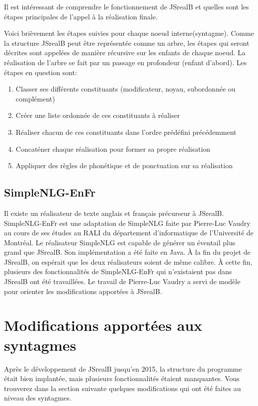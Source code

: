 \documentclass[11pt]{article} %
\newcommand{\system}[1]{\textsf{#1}}
\newcommand{\JSB}{\system{JSrealB}}
\begin{document}
Il est intéressant de comprendre le fonctionnement de \JSB{} et quelles
sont les étapes principales de l'appel à la réalisation finale.

Voici brièvement les étapes suivies pour chaque noeud interne(syntagme).
Comme la structure \JSB{} peut être représentée comme un arbre, les
étapes qui seront décrites sont appelées de manière récursive sur les
enfants de chaque noeud. La réalisation de l'arbre se fait par un
passage en profondeur (enfant d'abord). Les étapes en question sont:
\begin{enumerate}
\item Classer ses différents constituants (modificateur, noyau, subordonnée
ou complément)
\item Créer une liste ordonnée de ces constituants à réaliser
\item Réaliser chacun de ces constituants dans l'ordre prédéfini précédemment
\item Concaténer chaque réalisation pour former sa propre réalisation
\item Appliquer des règles de phonétique et de ponctuation sur sa réalisation
\end{enumerate}

\subsection{\system{SimpleNLG-EnFr}}

Il existe un réalisateur de texte anglais et français précurseur à
\JSB{}. SimpleNLG-EnFr est une adaptation de \system{SimpleNLG} faite par Pierre-Luc
Vaudry au cours de ses études au RALI du département d'informatique
de l'Université de Montréal\cite{simpleNLGVaudry}. Le réalisateur \system{SimpleNLG} est capable
de générer un éventail plus grand que \JSB{}. Son implémentation
a été faite en Java. À la fin du projet de \JSB{}, on espérait que
les deux réalisateurs soient de même calibre. À cette fin, plusieurs
des fonctionnalités de \system{SimpleNLG-EnFr} qui n'existaient pas dans \JSB{}
ont été travaillées. Le travail de Pierre-Luc Vaudry a servi de modèle
pour orienter les modifications apportées à \JSB{}.

\section{Modifications apportées aux syntagmes}
Après le développement de \JSB{} jusqu'en 2015, la structure du programme
était bien implantée, mais plusieurs fonctionnalités étaient manquantes.
Vous trouverez dans la section suivante quelques modifications qui
ont été faites au niveau des syntagmes.
\end{document}
